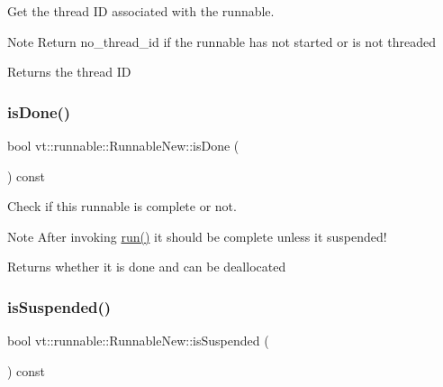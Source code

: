 Get the thread ID associated with the runnable. 

\begin{DoxyNote}{Note}
Return {\ttfamily no\+\_\+thread\+\_\+id} if the runnable has not started or is not threaded
\end{DoxyNote}
\begin{DoxyReturn}{Returns}
the thread ID 
\end{DoxyReturn}
\mbox{\label{structvt_1_1runnable_1_1_runnable_new_ad9acf28ef0fed7a7d63a9ca1d3ba3efc}} 
\subsubsection{\texorpdfstring{is\+Done()}{isDone()}}
{\footnotesize\ttfamily bool vt\+::runnable\+::\+Runnable\+New\+::is\+Done (\begin{DoxyParamCaption}{ }\end{DoxyParamCaption}) const\hspace{0.3cm}{\ttfamily [inline]}}



Check if this runnable is complete or not. 

\begin{DoxyNote}{Note}
After invoking {\ttfamily \hyperlink{structvt_1_1runnable_1_1_runnable_new_a3fa6c8ee2214c074c748000f782ad793}{run()}} it should be complete unless it suspended!
\end{DoxyNote}
\begin{DoxyReturn}{Returns}
whether it is done and can be deallocated 
\end{DoxyReturn}
\mbox{\label{structvt_1_1runnable_1_1_runnable_new_af45b4443eee6dff57249bda0a9c2b7f0}} 
\subsubsection{\texorpdfstring{is\+Suspended()}{isSuspended()}}
{\footnotesize\ttfamily bool vt\+::runnable\+::\+Runnable\+New\+::is\+Suspended (\begin{DoxyParamCaption}{ }\end{DoxyParamCaption}) const\hspace{0.3cm}{\ttfamily [inline]}}



